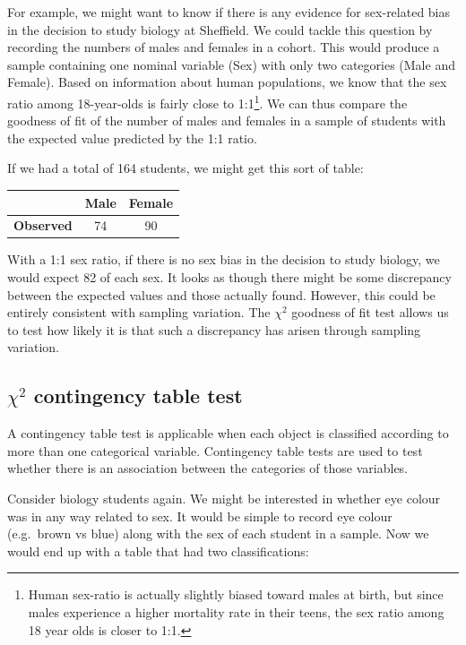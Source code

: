 \documentclass[
]{book}
\begin{document}
For example, we might want to know if there is any evidence for sex-related bias in the decision to study biology at Sheffield. We could tackle this question by recording the numbers of males and females in a cohort. This would produce a sample containing one nominal variable (Sex) with only two categories (Male and Female). Based on information about human populations, we know that the sex ratio among 18-year-olds is fairly close to 1:1\footnote{Human sex-ratio is actually slightly biased toward males at birth, but since males experience a higher mortality rate in their teens, the sex ratio among 18 year olds is closer to 1:1.}. We can thus compare the goodness of fit of the number of males and females in a sample of students with the expected value predicted by the 1:1 ratio.

If we had a total of 164 students, we might get this sort of table:

\begin{longtable}[]{@{}lcc@{}}
\toprule
& Male & Female \\
\midrule
\endhead
\textbf{Observed} & 74 & 90 \\
\bottomrule
\end{longtable}

With a 1:1 sex ratio, if there is no sex bias in the decision to study biology, we would expect 82 of each sex. It looks as though there might be some discrepancy between the expected values and those actually found. However, this could be entirely consistent with sampling variation. The \(\chi^{2}\) goodness of fit test allows us to test how likely it is that such a discrepancy has arisen through sampling variation.

\hypertarget{chi2-contingency-table-test}{%
\subsection{\texorpdfstring{\(\chi^{2}\) contingency table test}{\textbackslash chi\^{}\{2\} contingency table test}}\label{chi2-contingency-table-test}}

A contingency table test is applicable when each object is classified according to more than one categorical variable. Contingency table tests are used to test whether there is an association between the categories of those variables.

Consider biology students again. We might be interested in whether eye colour was in any way related to sex. It would be simple to record eye colour (e.g.~brown vs blue) along with the sex of each student in a sample. Now we would end up with a table that had two classifications:
\end{document}
